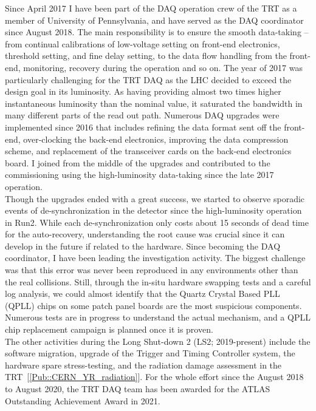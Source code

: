 \documentclass[12pt]{article}
\begin{document}
Since April 2017 I have been part of the DAQ operation crew of the TRT as a member of University of Pennsylvania,
and have served as the DAQ coordinator since August 2018.
The main responsibility is to ensure the smooth data-taking -- from continual calibrations of low-voltage setting on front-end electronics, threshold setting, and fine delay setting,
to the data flow handling from the front-end, monitoring, recovery during the operation and so on.
The year of 2017 was particularly challenging for the TRT DAQ as the LHC decided to exceed the design goal in its luminosity. 
As having providing almost two times higher instantaneous luminosity than the nominal value, it saturated the bandwidth in many different parts of the read out path.
Numerous DAQ upgrades were implemented since 2016 that includes refining the data format sent off the front-end, 
over-clocking the back-end electronics, 
improving the data compression scheme,
and replacement of the transceiver cards on the back-end electronics board.
I joined from the middle of the upgrades and contributed to the commissioning using the high-luminosity data-taking since the late 2017 operation. \\

Though the upgrades ended with a great success, we started to observe sporadic events of de-synchronization in the detector since the high-luminosity operation in Run2.
While each de-synchronization only costs about 15 seconds of dead time for the auto-recovery, 
understanding the root cause was crucial since it can develop in the future if related to the hardware.
Since becoming the DAQ coordinator, I have been leading the investigation activity.
The biggest challenge was that this error was never been reproduced in any environments other than the real collisions.
Still, through the in-situ hardware swapping tests and a careful log analysis,
we could almost identify that the Quartz Crystal Based PLL (QPLL) chips on some patch panel boards are the most suspicious components.
Numerous tests are in progress to understand the actual mechanism, and a QPLL chip replacement campaign is planned once it is proven. \\

The other activities during the Long Shut-down 2 (LS2; 2019-present) include the software migration, 
upgrade of the Trigger and Timing Controller system, the hardware spare stress-testing, and the radiation damage assessment in the TRT~[\ref{Pub::CERN_YR_radiation}].
For the whole effort since the August 2018 to August 2020, the TRT DAQ team has been awarded for the ATLAS Outstanding Achievement Award in 2021. \\
\end{document}
